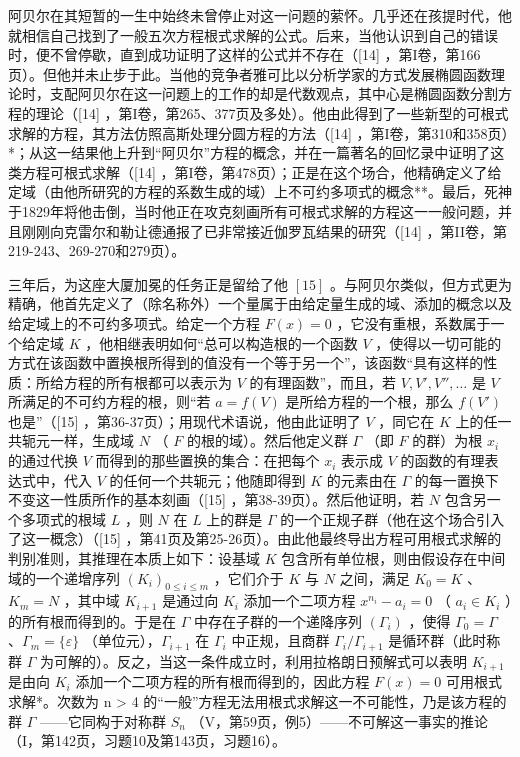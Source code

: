 阿贝尔在其短暂的一生中始终未曾停止对这一问题的萦怀。几乎还在孩提时代，他就相信自己找到了一般五次方程根式求解的公式。后来，当他认识到自己的错误时，便不曾停歇，直到成功证明了这样的公式并不存在（{[}14{]} ，第I卷，第166页）。但他并未止步于此。当他的竞争者雅可比以分析学家的方式发展椭圆函数理论时，支配阿贝尔在这一问题上的工作的却是代数观点，其中心是椭圆函数分割方程的理论（{[}14{]} ，第I卷，第265、377页及多处）。他由此得到了一些新型的可根式求解的方程，其方法仿照高斯处理分圆方程的方法（{[}14{]} ，第I卷，第310和358页）*；从这一结果他上升到“阿贝尔”方程的概念，并在一篇著名的回忆录中证明了这类方程可根式求解（{[}14{]} ，第I卷，第478页）；正是在这个场合，他精确定义了给定域（由他所研究的方程的系数生成的域）上不可约多项式的概念**。最后，死神于1829年将他击倒，当时他正在攻克刻画所有可根式求解的方程这一一般问题，并且刚刚向克雷尔和勒让德通报了已非常接近伽罗瓦结果的研究（{[}14{]} ，第II卷，第219-243、269-270和279页）。

三年后，为这座大厦加冕的任务正是留给了他 \([15]\) 。与阿贝尔类似，但方式更为精确，他首先定义了（除名称外）一个量属于由给定量生成的域、添加的概念以及给定域上的不可约多项式。给定一个方程 \(F(x) = 0\) ，它没有重根，系数属于一个给定域 \(K\) ，他相继表明如何“总可以构造根的一个函数 \(V\) ，使得以一切可能的方式在该函数中置换根所得到的值没有一个等于另一个”，该函数“具有这样的性质：所给方程的所有根都可以表示为 \(V\) 的有理函数”，而且，若 \(V, V', V'', \ldots\) 是 \(V\) 所满足的不可约方程的根，则“若 \(a = f(V)\) 是所给方程的一个根，那么 \(f(V')\) 也是”（{[}15{]} ，第36-37页）；用现代术语说，他由此证明了 \(V\) ，同它在 \(K\) 上的任一共轭元一样，生成域 \(N\) （ \(F\) 的根的域）。然后他定义群 \(\Gamma\) （即 \(F\) 的群）为根 \(x_i\) 的通过代换 \(V\) 而得到的那些置换的集合：在把每个 \(x_i\) 表示成 \(V\) 的函数的有理表达式中，代入 \(V\) 的任何一个共轭元；他随即得到 \(K\) 的元素由在 \(\Gamma\) 的每一置换下不变这一性质所作的基本刻画（{[}15{]} ，第38-39页）。然后他证明，若 \(N\) 包含另一个多项式的根域 \(L\) ，则 \(N\) 在 \(L\) 上的群是 \(\Gamma\) 的一个正规子群（他在这个场合引入了这一概念）（{[}15{]} ，第41页及第25-26页）。由此他最终导出方程可用根式求解的判别准则，其推理在本质上如下：设基域 \(K\) 包含所有单位根，则由假设存在中间域的一个递增序列 \((K_i)_{0 \leq i \leq m}\) ，它们介于 \(K\) 与 \(N\) 之间，满足 \(K_0 = K\) 、\(K_m = N\) ，其中域 \(K_{i+1}\) 是通过向 \(K_i\) 添加一个二项方程 \(x^{n_i} - a_i = 0\) （ \(a_i \in K_i\) ）的所有根而得到的。于是在 \(\Gamma\) 中存在子群的一个递降序列 \((\Gamma_i)\) ，使得 \(\Gamma_0 = \Gamma\) 、\(\Gamma_m = \{\varepsilon\}\) （单位元），\(\Gamma_{i+1}\) 在 \(\Gamma_i\) 中正规，且商群 \(\Gamma_i / \Gamma_{i+1}\) 是循环群（此时称群 \(\Gamma\) 为可解的）。反之，当这一条件成立时，利用拉格朗日预解式可以表明 \(K_{i+1}\) 是由向 \(K_i\) 添加一个二项方程的所有根而得到的，因此方程 \(F(x) = 0\) 可用根式求解*。次数为 n \textgreater{} 4 的“一般”方程无法用根式求解这一不可能性，乃是该方程的群 \(\Gamma\) ——它同构于对称群 \(S_n\) （V，第59页，例5）——不可解这一事实的推论（I，第142页，习题10及第143页，习题16）。

